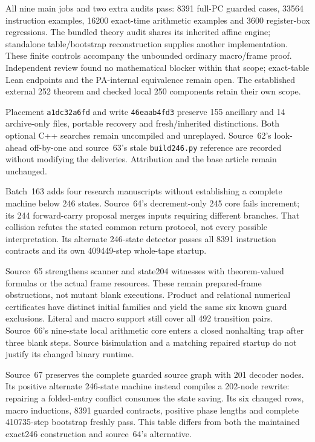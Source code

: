 \documentclass[11pt]{article}
\begin{document}
{All nine main jobs and two extra audits pass: 8391 full-PC guarded cases,
33564 instruction examples, 16200 exact-time arithmetic examples and
3600 register-box regressions. The bundled theory audit shares its inherited
affine engine; standalone table/bootstrap reconstruction supplies another
implementation. These finite controls accompany the unbounded ordinary
macro/frame proof. Independent review found no mathematical blocker within
that scope; exact-table Lean endpoints and the PA-internal equivalence remain
open. The established external 252 theorem and checked local 250 components
retain their own scope.

Placement \texttt{a1dc32a6fd} and write \texttt{46eaab4fd3} preserve 155 ancillary
and 14 archive-only files, portable recovery and fresh/inherited distinctions.
Both optional C++ searches remain uncompiled and unreplayed. Source~62's
look-ahead off-by-one and source~63's stale \texttt{build246.py} reference are
recorded without modifying the deliveries. Attribution and the base article
remain unchanged.

Batch~163 adds four research manuscripts without establishing a complete
machine below 246 states. Source~64's decrement-only 245 core fails increment;
its 244 forward-carry proposal merges inputs requiring different branches.
That collision refutes the stated common return protocol, not every possible
interpretation. Its alternate 246-state detector passes all 8391 instruction
contracts and its own 409449-step whole-tape startup.

Source~65 strengthens scanner and state204 witnesses with theorem-valued
formulas or the actual frame resources. These remain prepared-frame
obstructions, not mutant blank executions. Product and relational numerical
certificates have distinct initial families and yield the same six known guard
exclusions. Literal and macro support still cover all 492 transition pairs.
Source~66's nine-state local arithmetic core enters a closed nonhalting trap
after three blank steps. Source bisimulation and a matching repaired startup
do not justify its changed binary runtime.

Source~67 preserves the complete guarded source graph with 201 decoder nodes.
Its positive alternate 246-state machine instead compiles a 202-node rewrite:
repairing a folded-entry conflict consumes the state saving. Its six changed
rows, macro inductions, 8391 guarded contracts, positive phase lengths and
complete 410735-step bootstrap freshly pass. This table differs from both the
maintained exact246 construction and source~64's alternative.

}
\end{document}
